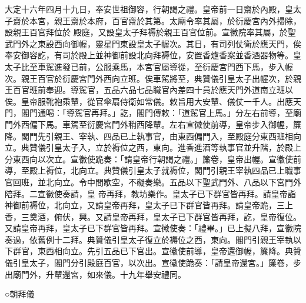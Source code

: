 \begin{pinyinscope}
 大定十六年四月十九日，奉安世祖御容，行朝謁之禮。皇帝前一日齋於內殿，皇太子齋於本宮，親王齋於本府，百官齋於其第。太廟令率其屬，於衍慶宮內外掃除，設親王百官拜位於
 殿庭，又設皇太子拜褥於親王百官位前。宣徽院率其屬，於聖武門外之東設西向御幄，靈星門東設皇太子幄次。其日，有司列仗衛於應天門，俟奉安御容訖，有司於殿上並神御前設北向拜褥位，安置香爐香案並香酒器物等。皇太子比至車駕進發已前，公服乘馬，本宮官屬導從，至衍慶宮門西下馬，步入幄次。親王百官於衍慶宮門外西向立班。俟車駕將至，典贊儀引皇太子出幄次，於親王百官班前奉迎。導駕官，五品六品七品職官內差四十員於應天門外道南立班以俟。皇帝服靴袍乘輦，從官傘扇侍衛如常儀。敕旨用大安輦、儀仗一千人。出應天門，閣門通喝：「導駕官再拜。」訖，閣門傳敕：「道駕官上馬。」分左右前導，至廟門外西偏下馬。車駕至衍慶宮門外稍西降輦。左右宣徽使前導，皇帝步入御幄，簾降。閣門先引親王、宰執、四品已上執事官，由東西偏門入，至殿庭分東西班相向立。典贊儀引皇太子入，立於褥位之西，東向。進香進酒等執事官並升階，於殿上分東西向以次立。宣徽使跪奏：「請皇帝行朝謁之禮。」簾卷，皇帝出幄。宣徽使前導，至殿上褥位，北向立。典贊儀引皇太子就褥位，閣門引親王宰執四品已上職事官回班，並北向立。令中間歇空，不礙奏樂。五品以下聖武門外、八品以下宮門外陪拜。二宣徽使奏請，皇
 帝再拜，教坊樂作。皇太子已下群官皆再拜。請皇帝詣神御前褥位，北向立，又請皇帝再拜，皇太子已下群官皆再拜。請皇帝跪，三上香，三奠酒，俯伏，興。又請皇帝再拜，皇太子已下群官皆再拜，訖，皇帝復位。又請皇帝再拜，皇太子已下群官皆再拜。宣徽使奏：「禮畢。」已上擬八拜，宣徽院奏過，依舊例十二拜。典贊儀引皇太子復立於褥位之西，東向。閣門引親王宰執以下群官，東西相向立。先引五品已下官出。宣徽使前導，皇帝還御幄，簾降。典贊儀引皇太子，閣門分引殿庭百官，以次出。宣徽使跪奏：「請皇帝還宮。」簾卷，步出廟門外，升輦還宮，如來儀。十九年舉安禮同。



 ○朝拜儀




\end{pinyinscope}
